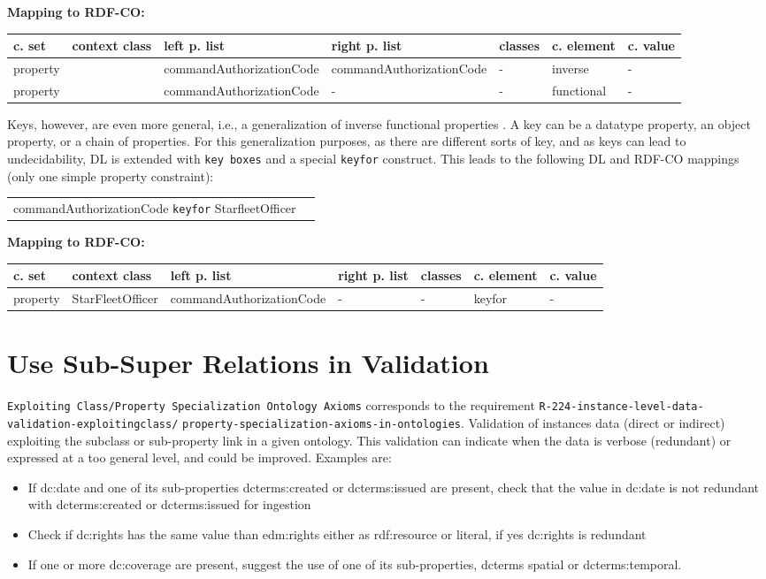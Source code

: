 \documentclass{llncs}
\newcommand{\ms}[1]{\texttt{#1}}
\newenvironment{gcotable}{
  \scriptsize
  \sffamily
  \vspace{0cm}
	\begin{center}
	\textbf{\vspace{0.4cm}Mapping to RDF-CO:} \\
  \begin{tabular}{l|l|l|l|l|l|l}
	\hline
  \textbf{c. set} & \textbf{context class} & \textbf{left p. list} & \textbf{right p. list} & \textbf{classes} & \textbf{c. element} & \textbf{c. value} \\
  \hline

}{
  \hline
  \end{tabular}
	\end{center}
}
\newenvironment{DL}{
\vspace{0cm}
	\begin{center}
  \begin{tabular}{r l}

}{
  \end{tabular}
	\end{center}
}
\begin{document}
\begin{DL}

\end{DL}

\begin{gcotable}
property &  & commandAuthorizationCode & commandAuthorizationCode & - & inverse & - \\
property &  & commandAuthorizationCode & - & - & functional & - \\
\end{gcotable}

Keys, however, are even more general, i.e., a generalization of inverse functional properties \cite{Schneider2009}.
A key can be a datatype property, an object property, or a chain of properties.
For this generalization purposes, as there are different sorts of key, and as keys can lead to undecidability, 
DL is extended with \ms{key boxes} and a special \ms{keyfor} construct\cite{Lutz2005}.
This leads to the following DL and RDF-CO mappings (only one simple property constraint):

\begin{DL}
commandAuthorizationCode \ms{keyfor} StarfleetOfficer
\end{DL}

\begin{gcotable}
property & StarFleetOfficer & commandAuthorizationCode & - & - & keyfor & - \\
\end{gcotable}

\section{Use Sub-Super Relations in Validation}

\ms{Exploiting Class/Property Specialization Ontology Axioms} corresponds to the requirement
\ms{R-224-instance-level-data-validation-exploitingclass/} \ms{property-specialization-axioms-in-ontologies}.
Validation of instances data (direct or indirect) exploiting the subclass or sub-property link in a given ontology.
This validation can indicate when the data is verbose (redundant) or expressed at a too general level, and could be improved.
Examples are:
\begin{itemize}
	\item If dc:date and one of its sub-properties dcterms:created or dcterms:issued are present, check that the value in dc:date is not redundant with dcterms:created or dcterms:issued for ingestion
  \item Check if dc:rights has the same value than edm:rights either as rdf:resource or literal, if yes dc:rights is redundant
  \item If one or more dc:coverage are present, suggest the use of one of its sub-properties, dcterms spatial or dcterms:temporal.
\end{itemize}
\end{document}

